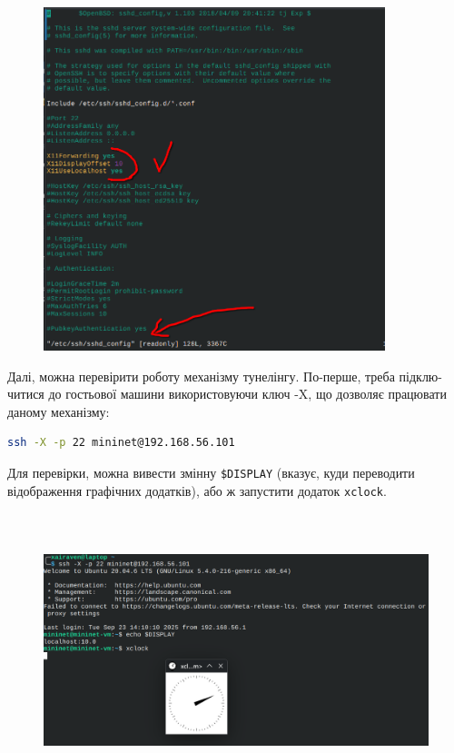 \documentclass[14pt, a4paper]{extreport}
\begin{document}
	\begin{figure}[H]
		\centering
		\includegraphics[height=10cm]{04} 
	\end{figure}
	
	Далі, можна перевірити роботу механізму тунелінгу. По-перше, треба підклю\hyp{}читися до гостьової машини використовуючи ключ -X, що дозволяє працювати даному механізму:
	
	\begin{lstlisting}[language=Bash]
		ssh -X -p 22 mininet@192.168.56.101\end{lstlisting}
	
	Для перевірки, можна вивести змінну \texttt{\$DISPLAY} (вказує, куди переводити відображення графічних додатків), або ж запустити додаток \texttt{xclock}.
	
	\begin{figure}[H]
		\centering
		\includegraphics[height=8cm]{05} 
	\end{figure}
	
\end{document}
